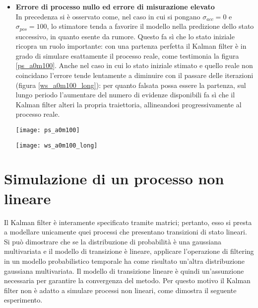 \begin{itemize}
\newpage

\item \textbf{Errore di processo nullo ed errore di misurazione elevato}\\
In precedenza si è osservato come, nel caso in cui si pongano  $\sigma_{acc} = 0$ e $\sigma_{pos} = 100$, lo stimatore tenda a favorire il modello nella predizione dello stato successivo, in quanto esente da rumore. Questo fa sì che lo stato iniziale ricopra un ruolo importante: con una partenza perfetta il Kalman filter è in grado di simulare esattamente il processo reale, come testimonia la figura \ref{ps_a0m100}. Anche nel caso in cui lo stato iniziale stimato e quello reale non coincidano l'errore tende lentamente a diminuire con il passare delle iterazioni (figura \ref{ws_a0m100_long}): per quanto falsata possa essere la partenza, sul lungo periodo l'aumentare del numero di evidenze disponibili fa sì che il Kalman filter alteri la propria traiettoria, allineandosi progressivamente al processo reale.

\begin{minipage}{\linewidth}
	\centering
	\texttt{[image: ps\_a0m100]}
	\label{ps_a0m100} 
\end{minipage}

\begin{minipage}{\linewidth}
	\centering
	\texttt{[image: ws\_a0m100\_long]}
	\label{ws_a0m100_long}
\end{minipage}

\end{itemize}

\section{Simulazione di un processo non lineare}

Il Kalman filter è interamente specificato tramite matrici; pertanto, esso si presta a modellare unicamente quei processi che presentano transizioni di stato lineari. Si può dimostrare che se la distribuzione di probabilità è una gaussiana multivariata e il modello di transizione è lineare, applicare l'operazione di filtering in un modello probabilistico temporale ha come risultato un'altra distribuzione gaussiana multivariata. Il modello di transizione lineare è quindi un'assunzione necessaria per garantire la convergenza del metodo. Per questo motivo il Kalman filter non è adatto a simulare processi non lineari, come dimostra il seguente esperimento.

